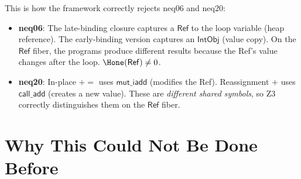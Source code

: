 This is how the framework correctly rejects neq06 and neq20:
\begin{itemize}
  \item \textbf{neq06}: The late-binding closure captures a
    $\mathsf{Ref}$ to the loop variable (heap reference).  The
    early-binding version captures an $\mathsf{IntObj}$ (value copy).
    On the $\mathsf{Ref}$ fiber, the programs produce different
    results because the Ref's value changes after the loop.
    $\Hone(\mathsf{Ref}) \neq 0$.
  \item \textbf{neq20}: In-place $\mathsf{+=}$ uses
    $\mathsf{mut\_iadd}$ (modifies the Ref).  Reassignment $+$ uses
    $\mathsf{call\_add}$ (creates a new value).  These are
    \emph{different shared symbols}, so Z3 correctly distinguishes
    them on the $\mathsf{Ref}$ fiber.
\end{itemize}

\section{Why This Could Not Be Done Before}

